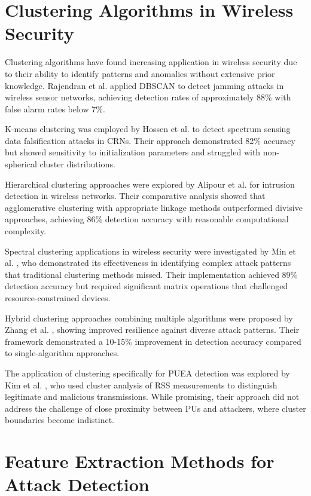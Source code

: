 \section{Clustering Algorithms in Wireless Security}

Clustering algorithms have found increasing application in wireless security due to their ability to identify patterns and anomalies without extensive prior knowledge. Rajendran et al. \cite{rajendran2019clustering} applied DBSCAN to detect jamming attacks in wireless sensor networks, achieving detection rates of approximately 88\% with false alarm rates below 7\%.

K-means clustering was employed by Hossen et al. \cite{hossen2015kmeans} to detect spectrum sensing data falsification attacks in CRNs. Their approach demonstrated 82\% accuracy but showed sensitivity to initialization parameters and struggled with non-spherical cluster distributions.

Hierarchical clustering approaches were explored by Alipour et al. \cite{alipour2016hierarchical} for intrusion detection in wireless networks. Their comparative analysis showed that agglomerative clustering with appropriate linkage methods outperformed divisive approaches, achieving 86\% detection accuracy with reasonable computational complexity.

Spectral clustering applications in wireless security were investigated by Min et al. \cite{min2018spectral}, who demonstrated its effectiveness in identifying complex attack patterns that traditional clustering methods missed. Their implementation achieved 89\% detection accuracy but required significant matrix operations that challenged resource-constrained devices.

Hybrid clustering approaches combining multiple algorithms were proposed by Zhang et al. \cite{zhang2019hybrid}, showing improved resilience against diverse attack patterns. Their framework demonstrated a 10-15\% improvement in detection accuracy compared to single-algorithm approaches.

The application of clustering specifically for PUEA detection was explored by Kim et al. \cite{kim2017cluster}, who used cluster analysis of RSS measurements to distinguish legitimate and malicious transmissions. While promising, their approach did not address the challenge of close proximity between PUs and attackers, where cluster boundaries become indistinct.

\section{Feature Extraction Methods for Attack Detection}

